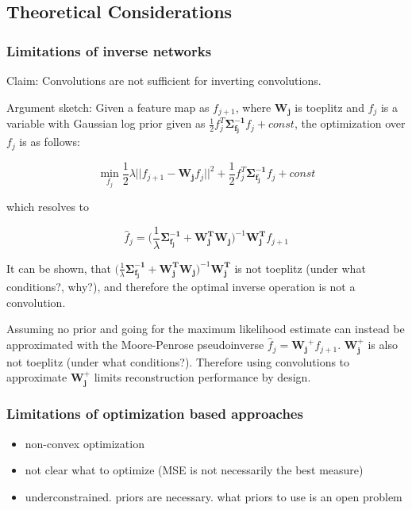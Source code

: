 \documentclass{article}
\begin{document}
\subsection{Theoretical Considerations}

\subsubsection{Limitations of inverse networks}


Claim: Convolutions are not sufficient for inverting convolutions.

Argument sketch: Given a feature map as $f_{j+1}$, where $\bm{W_j}$ is toeplitz and $f_j$ is a variable with Gaussian log prior given as $\frac{1}{2} f_j^T \bm{\Sigma_{f_j}^{-1}}f_j + const$, the optimization over $f_j$ is as follows:

\begin{equation}
	\min_{f_j} \frac{1}{2} \lambda || f_{j+1} - \bm{W_j} f_j ||^2 + \frac{1}{2} f_j^T \bm{\Sigma_{f_j}^{-1}} f_j + const
\end{equation}

which resolves to 

\begin{equation}
\hat{f}_j =  \bigg( \frac{1}{\lambda}  \bm{\Sigma_{f_j}^{-1}} + \bm{W_j^T} \bm{W_j}\bigg)^{-1} \bm{W_j^T} f_{j+1}
\end{equation}

It can be shown, that $\big( \frac{1}{\lambda}  \bm{\Sigma_{f_j}^{-1}} + \bm{W_j^T} \bm{W_j}\big)^{-1} \bm{W_j^T}$ is not toeplitz (under what conditions?, why?), and therefore the optimal inverse operation is not a convolution.

Assuming no prior and going for the maximum likelihood estimate can instead be approximated with the Moore-Penrose pseudoinverse $\hat{f}_j = \bm{W_j}^+ f_{j+1}$. $\bm{W_j^{+}}$ is also not toeplitz (under what conditions?). Therefore using convolutions to approximate $\bm{W_j^{+}}$ limits reconstruction performance by design.


\subsubsection{Limitations of optimization based approaches}

\begin{itemize}
	\item non-convex optimization
	\item not clear what to optimize (MSE is not necessarily the best measure)
	\item underconstrained. priors are necessary. what priors to use is an open problem
\end{itemize}
\end{document}
